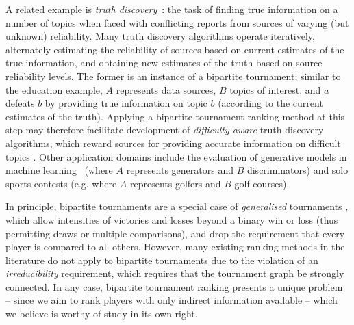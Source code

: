 A related example is \emph{truth discovery}~\cite{li_survey_2016,
singleton_booth_2020}: the task of finding true information on a number of
topics when faced with conflicting reports from sources of varying (but
unknown) reliability. Many truth discovery algorithms operate iteratively,
alternately estimating the reliability of sources based on current estimates of
the true information, and obtaining new estimates of the truth based on source
reliability levels. The former is an instance of a bipartite tournament;
similar to the education example, $A$ represents data sources, $B$ topics of
interest, and $a$ defeats $b$ by providing true information on topic $b$
(according to the current estimates of the truth). Applying a bipartite
tournament ranking method at this step may therefore facilitate development of
\emph{difficulty-aware} truth discovery algorithms, which reward sources for
providing accurate information on difficult topics
\cite{galland_corroborating_2010}.
%
Other application domains include the evaluation of generative models
in machine learning~\cite{olsson2018skill} (where $A$ represents generators and
$B$ discriminators) and solo sports contests (e.g. where $A$ represents golfers
and $B$ golf courses).

In principle, bipartite tournaments are a special case of \emph{generalised}
tournaments
\cite{gonzalez2014paired,slutzki2005ranking,csato2019impossibility}, which
allow intensities of victories and losses beyond a binary win or loss (thus
permitting draws or multiple comparisons), and drop the requirement that every
player is compared to all others.  However, many existing ranking methods in
the literature do not apply to bipartite tournaments due to the violation of an
\emph{irreducibility} requirement, which requires that the tournament graph be
strongly connected. In any case, bipartite tournament ranking presents a unique
problem -- since we aim to rank players with only indirect information
available -- which we believe is worthy of study in its own right.

